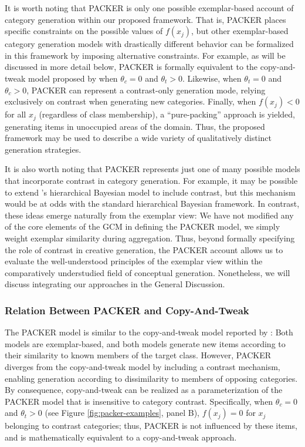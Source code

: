 \documentclass[12pt]{article}
\begin{document}
\begin{flushleft}
It is worth noting that PACKER is only one possible exemplar-based account of
category generation within our proposed framework. That is, PACKER places
specific constraints on the possible values of $f(x_j)$, but other
exemplar-based category generation models with drastically different behavior
can be formalized in this framework by imposing alternative constraints. For
example, as will be discussed in more detail below, PACKER is formally
equivalent to the copy-and-tweak model proposed by \cite{jern2013probabilistic}
when $\theta_c = 0$ and $\theta_t > 0$. Likewise, when
$\theta_t = 0$ and $\theta_c > 0$, PACKER can represent a
contrast-only generation mode, relying exclusively on contrast when generating
new categories. Finally, when $f(x_j) < 0$ for all $x_j$ (regardless of class
membership), a ``pure-packing'' approach is yielded, generating items in
unoccupied areas of the domain. Thus, the proposed framework may be used to
describe a wide variety of qualitatively distinct generation strategies.

It is also worth noting that PACKER represents just one of many possible models
that incorporate contrast in category generation. For example, it may be
possible to extend \cite{jern2013probabilistic}'s hierarchical Bayesian model to
include contrast, but this mechanism would be at odds with the standard
hierarchical Bayesian framework. In contrast, these ideas emerge naturally from
the exemplar view: We have not modified any of the core elements of the GCM in
defining the PACKER model, we simply weight exemplar similarity during
aggregation. Thus, beyond formally specifying the role of contrast in creative
generation, the PACKER account allows us to evaluate the well-understood
principles of the exemplar view within the comparatively understudied field of
conceptual generation. Nonetheless, we will discuss integrating our approaches
in the General Discussion.

\subsubsection{Relation Between PACKER and Copy-And-Tweak}
\label{section:copytweak-packer} The PACKER model is similar to the
copy-and-tweak model reported by \cite{jern2013probabilistic}: Both models are
exemplar-based, and both models generate new items according to their similarity
to known members of the target class. However, PACKER diverges from the
copy-and-tweak model by including a contrast mechanism, enabling generation
according to dissimilarity to members of opposing categories. By consequence,
copy-and-tweak can be realized as a parameterization of the PACKER model that is
insensitive to category contrast. Specifically, when $\theta_c = 0$ and
$\theta_t > 0$ (see Figure \ref{fig:packer-examples}, panel B),
$f(x_j) = 0$ for $x_j$ belonging to contrast categories; thus, PACKER is not
influenced by these items, and is mathematically equivalent to a copy-and-tweak
approach.


\end{flushleft}
\end{document}

